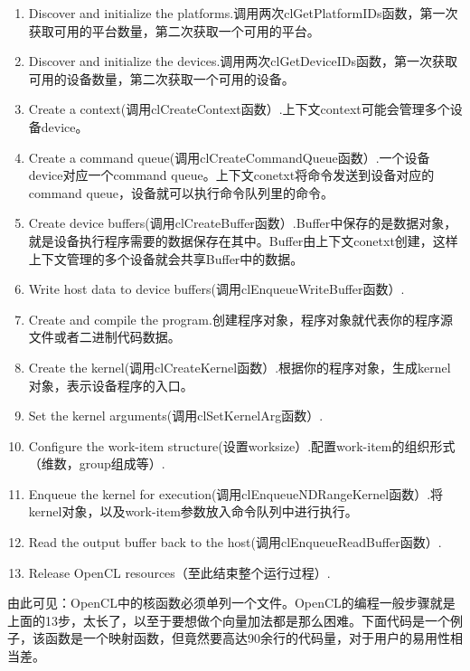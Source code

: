 \documentclass[paper=a4]{ctexart} %
\numberwithin{equation}{section} %
\numberwithin{figure}{section} %
\numberwithin{table}{section} %
\begin{document}
\begin{enumerate}
\item Discover and initialize the platforms.调用两次clGetPlatformIDs函数，第一次获取可用的平台数量，第二次获取一个可用的平台。
\item Discover and initialize the devices.调用两次clGetDeviceIDs函数，第一次获取可用的设备数量，第二次获取一个可用的设备。
\item Create a context(调用clCreateContext函数）.上下文context可能会管理多个设备device。
\item Create a command queue(调用clCreateCommandQueue函数）.一个设备device对应一个command queue。上下文conetxt将命令发送到设备对应的command queue，设备就可以执行命令队列里的命令。
\item Create device buffers(调用clCreateBuffer函数）.Buffer中保存的是数据对象，就是设备执行程序需要的数据保存在其中。Buffer由上下文conetxt创建，这样上下文管理的多个设备就会共享Buffer中的数据。
\item Write host data to device buffers(调用clEnqueueWriteBuffer函数）.
\item Create and compile the program.创建程序对象，程序对象就代表你的程序源文件或者二进制代码数据。
\item Create the kernel(调用clCreateKernel函数）.根据你的程序对象，生成kernel对象，表示设备程序的入口。
\item Set the kernel arguments(调用clSetKernelArg函数）.
\item Configure the work-item structure(设置worksize）.配置work-item的组织形式（维数，group组成等）.
\item Enqueue the kernel for execution(调用clEnqueueNDRangeKernel函数）.将kernel对象，以及work-item参数放入命令队列中进行执行。
\item Read the output buffer back to the host(调用clEnqueueReadBuffer函数）.
\item Release OpenCL resources（至此结束整个运行过程）.
\end{enumerate}
由此可见：OpenCL中的核函数必须单列一个文件。OpenCL的编程一般步骤就是上面的13步，太长了，以至于要想做个向量加法都是那么困难。下面代码是一个例子，该函数是一个映射函数，但竟然要高达90余行的代码量，对于用户的易用性相当差。
\end{document}
